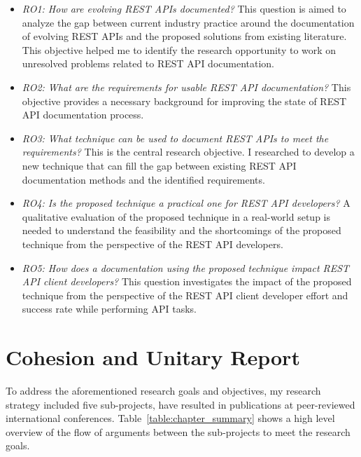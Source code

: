 \begin{itemize}
  \item \textit{RO1: How are evolving REST APIs documented?} This question is aimed to analyze the gap between current industry practice around the documentation of evolving REST APIs and the proposed solutions from existing literature. This objective helped me to identify the research opportunity to work on unresolved problems related to REST API documentation.
  \item \textit{RO2: What are the requirements for usable REST API documentation?} This objective provides a necessary background for improving the state of REST API documentation process.
  \item \textit{RO3: What technique can be used to document REST APIs to meet the requirements?} This is the central research objective. I researched to develop a new technique that can fill the gap between existing REST API documentation methods and the identified requirements.
  \item \textit{RO4: Is the proposed technique a practical one for REST API developers?} A qualitative evaluation of the proposed technique in a real-world setup is needed to understand the feasibility and the shortcomings of the proposed technique from the perspective of the REST API developers.
  \item \textit{RO5: How does a documentation using the proposed technique impact REST API client developers?} This question investigates the impact of the proposed technique from the perspective of the REST API client developer effort and success rate while performing API tasks.
\end{itemize}

\section{Cohesion and Unitary Report}
To address the aforementioned research goals and objectives, my research strategy included five sub-projects, have resulted in publications at peer-reviewed international conferences. Table~\ref{table:chapter_summary} shows a high level overview of the flow of arguments between the sub-projects to meet the research goals.

